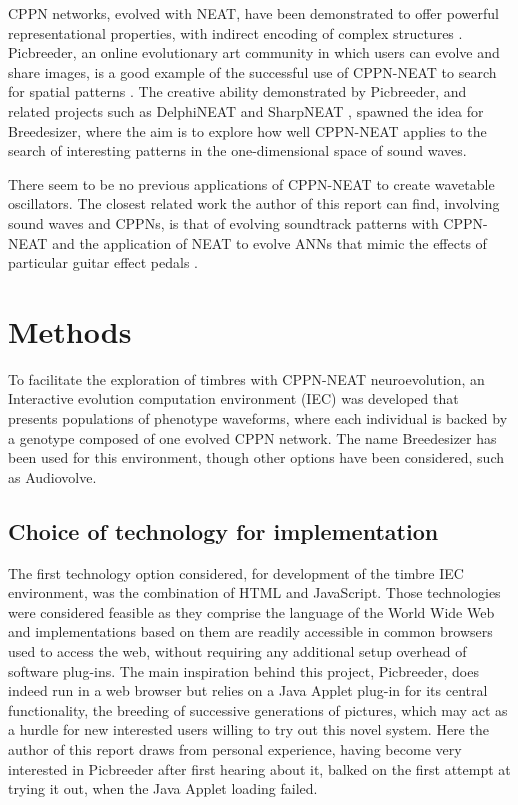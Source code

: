 \documentclass[conference]{IEEEtran}
\begin{document}
CPPN networks, evolved with NEAT, have been demonstrated to offer powerful representational properties, with indirect encoding of complex structures \cite{stanley2007compositional}.  Picbreeder, an online evolutionary art community in which users can evolve and share images, is a good example of the successful use of CPPN-NEAT to search for spatial patterns \cite{secretan2011picbreeder}.  The creative ability demonstrated by Picbreeder, and related projects such as DelphiNEAT and SharpNEAT \cite{stanley2007compositional}, spawned the idea for Breedesizer, where the aim is to explore how well CPPN-NEAT applies to the search of interesting patterns in the one-dimensional space of sound waves.

There seem to be no previous applications of CPPN-NEAT to create wavetable oscillators.  The closest related work the author of this report can find, involving sound waves and CPPNs, is that of evolving soundtrack patterns with CPPN-NEAT \cite{SoundBreeder} and the application of NEAT to evolve ANNs that mimic the effects of particular guitar effect pedals \cite{deboer2013systems}\cite{deboer2008systems}.



\section{Methods}

To facilitate the exploration of timbres with CPPN-NEAT neuroevolution, an Interactive evolution computation environment (IEC) was developed that presents populations of phenotype waveforms, where each individual is backed by a genotype composed of one evolved CPPN network.  The name Breedesizer has been used for this environment, though other options have been considered, such as Audiovolve.

\subsection{Choice of technology for implementation}

The first technology option considered, for development of the timbre IEC environment, was the combination of HTML and JavaScript.  Those technologies were considered feasible as they comprise the language of the World Wide Web and implementations based on them are readily accessible in common browsers used to access the web, without requiring any additional setup overhead of software plug-ins.  The main inspiration behind this project, Picbreeder, does indeed run in a web browser but relies on a Java Applet plug-in for its central functionality, the breeding of successive generations of pictures, which may act as a hurdle for new interested users willing to try out this novel system.  Here the author of this report draws from personal experience, having become very interested in Picbreeder after first hearing about it, balked on the first attempt at trying it out, when the Java Applet loading failed.
\end{document}
